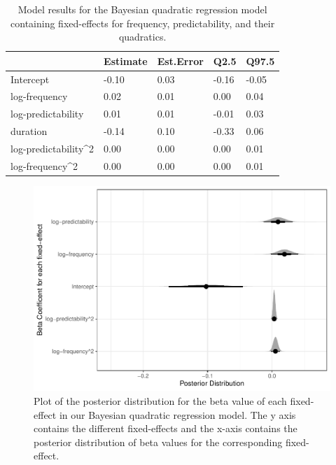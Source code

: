 \documentclass[
  man,floatsintext]{apa6}
\begin{document}
\begin{table}[H]

\begin{center}
\begin{threeparttable}

\caption{\label{tab:brmsQuadraticNoInter}Model results for the Bayesian quadratic regression model containing fixed-effects for frequency, predictability, and their quadratics.}

\begin{tabular}{lllll}
\toprule
 & \multicolumn{1}{c}{Estimate} & \multicolumn{1}{c}{Est.Error} & \multicolumn{1}{c}{Q2.5} & \multicolumn{1}{c}{Q97.5}\\
\midrule
Intercept & -0.10 & 0.03 & -0.16 & -0.05\\
log-frequency & 0.02 & 0.01 & 0.00 & 0.04\\
log-predictability & 0.01 & 0.01 & -0.01 & 0.03\\
duration & -0.14 & 0.10 & -0.33 & 0.06\\
log-predictability\textasciicircum{}2 & 0.00 & 0.00 & 0.00 & 0.01\\
log-frequency\textasciicircum{}2 & 0.00 & 0.00 & 0.00 & 0.01\\
\bottomrule
\end{tabular}

\end{threeparttable}
\end{center}

\end{table}

\begin{figure}

{\centering \includegraphics[width=0.8\linewidth]{write-up_files/figure-latex/posteriorplotFullQuadratic-1} 

}

\caption{Plot of the posterior distribution for the beta value of each fixed-effect in our Bayesian quadratic regression model. The y axis contains the different fixed-effects and the x-axis contains the posterior distribution of beta values for the corresponding fixed-effect.}\label{fig:posteriorplotFullQuadratic}
\end{figure}
\end{document}

